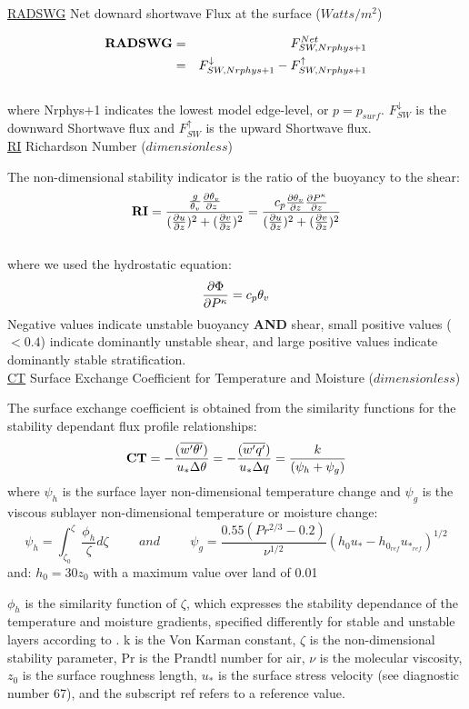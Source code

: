 { \underline {RADSWG} Net downard shortwave Flux at the surface ($Watts/m^2$)}

\begin{eqnarray*}
{\bf RADSWG} & =  & F_{SW,Nrphys+1}^{Net} \\
             & =  & F_{SW,Nrphys+1}^\downarrow - F_{SW,Nrphys+1}^\uparrow
\end{eqnarray*}
\\
where Nrphys+1 indicates the lowest model edge-level, or $p = p_{surf}$.
$F_{SW}^\downarrow$ is
the downward Shortwave flux and $F_{SW}^\uparrow$ is the upward Shortwave flux.
\\


\noindent
{ \underline {RI} Richardson Number} ($dimensionless$)

\noindent
The non-dimensional stability indicator is the ratio of the buoyancy to the shear:
\[
{\bf RI} = \frac{ \frac{g}{\theta_v} \frac{\partial \theta_v}{\partial z} }{ (\frac{\partial u}{\partial z})^2 + (\frac{\partial v}{\partial z})^2 }
 =  \frac{c_p \frac{\partial \theta_v}{\partial z} \frac{\partial P^ \kappa}{\partial z} }{ (\frac{\partial u}{\partial z})^2 + (\frac{\partial v}{\partial z})^2 }
\]
\\
where we used the hydrostatic equation: 
\[
{\frac{\partial \Phi}{\partial P^ \kappa}} = c_p \theta_v
\]
Negative values indicate unstable buoyancy {\bf{AND}} shear, small positive values ($<0.4$)
indicate dominantly unstable shear, and large positive values indicate dominantly stable
stratification.
\\

\noindent
{ \underline {CT}  Surface Exchange Coefficient for Temperature and Moisture ($dimensionless$) }

\noindent
The surface exchange coefficient is obtained from the similarity functions for the stability
 dependant flux profile relationships:
\[
{\bf CT} = -\frac{( \overline{w^{\prime}\theta^{\prime}} ) }{ u_* \Delta \theta } = 
-\frac{( \overline{w^{\prime}q^{\prime}} ) }{ u_* \Delta q } = 
\frac{ k }{ (\psi_{h} + \psi_{g}) } 
\]
where $\psi_h$ is the surface layer non-dimensional temperature change and $\psi_g$ is the
viscous sublayer non-dimensional temperature or moisture change:
\[
\psi_{h} = \int_{\zeta_{0}}^{\zeta} \frac{\phi_{h} }{ \zeta} d \zeta \hspace{1cm} and 
\hspace{1cm} \psi_{g} = \frac{ 0.55 (Pr^{2/3} - 0.2) }{ \nu^{1/2} } 
(h_{0}u_{*} - h_{0_{ref}}u_{*_{ref}})^{1/2}
\]
and:
$h_{0} = 30z_{0}$ with a maximum value over land of 0.01

\noindent
$\phi_h$ is the similarity function of $\zeta$, which expresses the stability dependance of
the temperature and moisture gradients, specified differently for stable and unstable 
layers according to \cite{helfschu:95}. k is the Von Karman constant, $\zeta$ is the 
non-dimensional stability parameter, Pr is the Prandtl number for air, $\nu$ is the molecular 
viscosity, $z_{0}$ is the surface roughness length, $u_*$ is the surface stress velocity 
(see diagnostic number 67), and the subscript ref refers to a reference value.
\\

